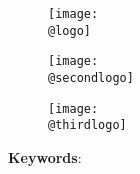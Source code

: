 

\begin{titlepage}
    \begin{center}
      \makeatletter 
        \begin{figure}[!htb]
          \centering
          
            \begin{minipage}{0.25\textwidth}
            \centering       
            \texttt{[image: \\@logo]}
            \end{minipage}
            \hspace{1cm}
            \begin{minipage}{0.25\textwidth}
            \centering       
            \texttt{[image: \\@secondlogo]}
            \end{minipage}
            \hspace{1cm}
            \begin{minipage}{0.25\textwidth}
            \centering       
            \texttt{[image: \\@thirdlogo]}
            \end{minipage}

        \end{figure}
      \makeatother
      \vspace*{0.25cm}

        \maketitle

        \vspace{2cm}
        \large 
        \textbf{Keywords}:\\
        \makeatletter
        \textbf{\@keywords}
        \makeatother
        

\end{center}
\end{titlepage}

